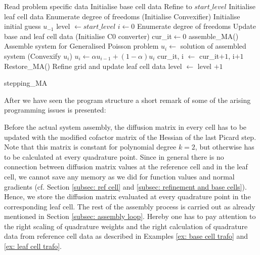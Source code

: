 \begin{algorithm}[H]
\begin{algorithmic}
	\State Read problem specific data
	\State Initialise base cell data
	\State Refine to $start\_level$
	\State Initialise leaf cell data
	\State Enumerate degree of freedoms
	\State (Initialise Convexifier)
	\State Initialise initial guess $u_{-1}$
	\State level $\gets start\_level$
	\State $i \gets 0$
		\State Enumerate degree of freedoms
		\State Update base and leaf cell data
		\State (Initialise C0 converter) 
		\State cur\_it$ \gets 0$
			\State  assemble\_MA()                              \Comment Assemble system for Generalised Poisson problem
			\State $u_i \gets$ solution of assembled system
			\State (Convexify $u_i$)		 
			\State $u_i \gets \alpha u_{i-1}  +(1-\alpha) u_i$
			\State	cur\_it, i $\gets$ cur\_it$+1$, i$+1$
			\State Restore\_MA() 		
		\EndWhile
		\State Refine grid and update leaf cell data
		\State level $\gets$ level $+1$
	\EndWhile
\end{algorithmic}
\caption{stepping\_MA}
\label{alg: stepping}
\end{algorithm}

After we have seen the program structure a short remark of some of the arising programming issues is presented:

Before the actual system assembly, the diffusion matrix in every cell has to be updated with the modified cofactor matrix of the Hessian of the last Picard step. Note that this matrix is constant for polynomial degree $k=2$, but otherwise has to be calculated at every quadrature point. Since in general there is no connection between diffusion matrix values at the reference cell and in the leaf cell, we cannot save any memory as we did for function values and normal gradients (cf. Section \ref{subsec: ref cell} and \ref{subsec: refinement and base cells}). Hence, we store the diffusion matrix evaluated at every quadrature point in the corresponding leaf cell.
The rest of the assembly process is carried out as already mentioned in Section \ref{subsec: assembly loop}. Hereby one has to pay attention to the right scaling of quadrature weights and the right calculation of quadrature data from reference cell data as described in Examples \ref{ex: base cell trafo} and \ref{ex: leaf cell trafo}. 

